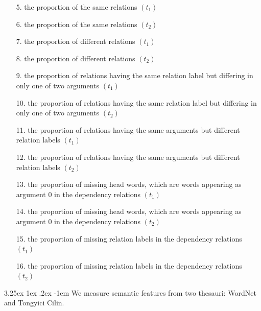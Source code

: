 \documentclass[12pt]{article}
\makeatletter
\newcounter{subsubsubsection}[subsubsection]
\renewcommand\paragraph{\@startsection{paragraph}{5}{\z@}%
  {3.25ex \@plus1ex \@minus.2ex}%
  {-1em}%
  {\normalfont\normalsize\bfseries}}
\makeatother
\begin{document}
\begin{CJK*}{UTF8}{bkai}
\begin{spacing}{1.77}
\begin{enumerate}
    \item[ 5.] the proportion of the same relations $(t_1)$
    \item[ 6.] the proportion of the same relations $(t_2)$
    \item[ 7.] the proportion of different relations $(t_1)$
    \item[ 8.] the proportion of different relations $(t_2)$
    \item[ 9.] the proportion of relations having the same relation label but differing in only one of two arguments $(t_1)$
    \item[10.] the proportion of relations having the same relation label but differing in only one of two arguments $(t_2)$
    \item[11.] the proportion of relations having the same arguments but different relation labels $(t_1)$
    \item[12.] the proportion of relations having the same arguments but different relation labels $(t_2)$
    \item[13.] the proportion of missing head words, which are words appearing as argument 0 in the dependency relations $(t_1)$
    \item[14.] the proportion of missing head words, which are words appearing as argument 0 in the dependency relations $(t_2)$
    \item[15.] the proportion of missing relation labels in the dependency relations $(t_1)$
    \item[16.] the proportion of missing relation labels in the dependency relations $(t_2)$
\end{enumerate}


\paragraph{}
We measure semantic features from two thesauri: WordNet and Tongyici Cilin.


\end{spacing}
\end{CJK*}
\end{document}
